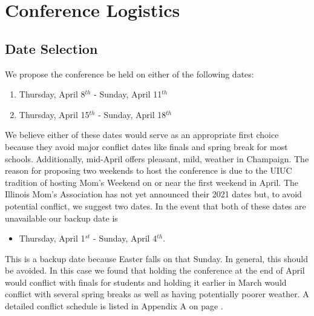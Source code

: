
\section{Conference Logistics}

\subsection{Date Selection}


We propose the conference be held on either of the following dates: 
\begin{enumerate}
	\item Thursday, April 8$^{th}$ - Sunday, April 11$^{th}$ 
	\item Thursday, April 15$^{th}$ - Sunday, April 18$^{th}$
\end{enumerate}
We believe either of these dates would serve as an appropriate first choice because they avoid major conflict dates like finals and spring break for most schools. Additionally, mid-April offers pleasant, mild, weather in Champaign. The reason for proposing two weekends to host the conference is due to the UIUC tradition of hosting Mom's Weekend on or near the first weekend in April. The Illinois Mom's Association has not yet announced their 2021 dates but, to avoid potential conflict, we suggest two dates. In the event that both of these dates are unavailable our backup date is 
\begin{itemize}
	\item Thursday, April 1$^{st}$ - Sunday, April 4$^{th}$.  
\end{itemize}
This is a backup date because Easter falls on that Sunday. In general, this should be avoided. In this case we found that holding the conference at the end of April would conflict with finals for students and holding it earlier in March would conflict with several spring breaks as well as having potentially poorer weather. A detailed conflict schedule is listed in Appendix A on page \pageref{appendix:schedule}. 


